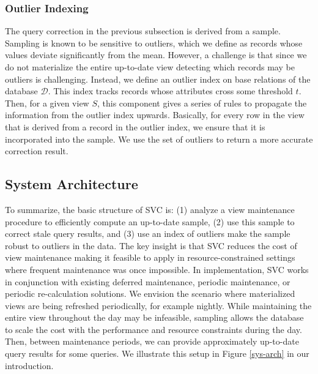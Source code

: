 \subsubsection{Outlier Indexing}
The query correction in the previous subsection is derived from a sample.
Sampling is known to be sensitive to outliers, which we define as records whose values deviate significantly from the mean.
However, a challenge is that since we do not materialize the entire up-to-date view detecting which records may be outliers is challenging.
Instead, we define an outlier index on base relations of the database $\mathcal{D}$.
This index tracks records whose attributes cross some threshold $t$.
Then, for a given view $S$, this component gives a series of rules to propagate the information from the outlier index upwards.
Basically, for every row in the view that is derived from a record in the outlier index, we ensure that it is incorporated into the sample.
We use the set of outliers to return a more accurate correction result.

\subsection{System Architecture}
To summarize, the basic structure of SVC is: (1) analyze a view maintenance procedure to efficiently compute an up-to-date sample, (2) use this sample to correct stale query results, and (3) use an index of outliers make the sample robust to outliers in the data. 
The key insight is that SVC reduces the cost of view maintenance making it feasible to apply in resource-constrained settings where frequent maintenance was once impossible.
In implementation, SVC works in conjunction with existing deferred maintenance, periodic maintenance, or periodic re-calculation solutions.
We envision the scenario where materialized views are being refreshed periodically, for example nightly.
While maintaining the entire view throughout the day may be infeasible, sampling allows the database to scale the cost with the performance and resource constraints during the day.
Then, between maintenance periods, we can provide approximately up-to-date query results for some queries.
We illustrate this setup in Figure \ref{sys-arch} in our introduction.
 
